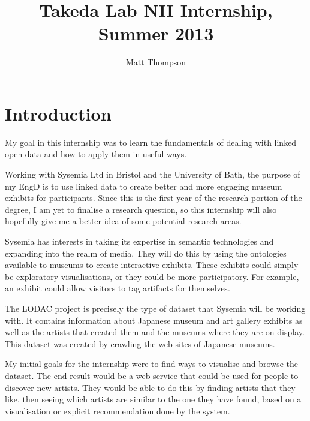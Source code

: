 \documentclass[11pt]{article}
\title{Takeda Lab NII Internship, Summer 2013}
\author{Matt Thompson}
\begin{document}
\maketitle
\clearpage
\tableofcontents
\clearpage


\section{Introduction}
My goal in this internship was to learn the fundamentals of dealing with linked open data and how to apply them in useful ways.

Working with Sysemia Ltd in Bristol and the University of Bath, the purpose of my EngD is to use linked data to create better and more engaging museum exhibits for participants. Since this is the first year of the research portion of the degree, I am yet to finalise a research question, so this internship will also hopefully give me a better idea of some potential research areas.

Sysemia has interests in taking its expertise in semantic technologies and expanding into the realm of media. They will do this by using the ontologies available to museums to create interactive exhibits. These exhibits could simply be exploratory visualisations, or they could be more participatory. For example, an exhibit could allow visitors to tag artifacts for themselves.

The LODAC project is precisely the type of dataset that Sysemia will be working with. It contains information about Japanese museum and art gallery exhibits as well as the artists that created them and the museums where they are on display. This dataset was created by crawling the web sites of Japanese museums.

My initial goals for the internship were to find ways to visualise and browse the dataset. The end result would be a web service that could be used for people to discover new artists. They would be able to do this by finding artists that they like, then seeing which artists are similar to the one they have found, based on a visualisation or explicit recommendation done by the system.
\end{document}
